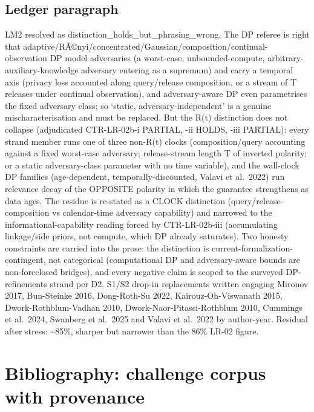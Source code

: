 \documentclass[
  11pt,
]{article}
\begin{document}
\subsection{Ledger paragraph}\label{ledger-paragraph}

LM2 resolved as distinction\_holds\_but\_phrasing\_wrong. The DP referee
is right that
adaptive/RÃ©nyi/concentrated/Gaussian/composition/continual-observation
DP model adversaries (a worst-case, unbounded-compute,
arbitrary-auxiliary-knowledge adversary entering as a supremum) and
carry a temporal axis (privacy loss accounted along query/release
composition, or a stream of T releases under continual observation), and
adversary-aware DP even parametrises the fixed adversary class; so
`static, adversary-independent' is a genuine mischaracterisation and
must be replaced. But the R(t) distinction does not collapse
(adjudicated CTR-LR-02b-i PARTIAL, -ii HOLDS, -iii PARTIAL): every
strand member runs one of three non-R(t) clocks (composition/query
accounting against a fixed worst-case adversary; release-stream length T
of inverted polarity; or a static adversary-class parameter with no time
variable), and the wall-clock DP families (age-dependent,
temporally-discounted, Valavi et al.~2022) run relevance decay of the
OPPOSITE polarity in which the guarantee strengthens as data ages. The
residue is re-stated as a CLOCK distinction (query/release-composition
vs calendar-time adversary capability) and narrowed to the
informational-capability reading forced by CTR-LR-02b-iii (accumulating
linkage/side priors, not compute, which DP already saturates). Two
honesty constraints are carried into the prose: the distinction is
current-formalization-contingent, not categorical (computational DP and
adversary-aware bounds are non-foreclosed bridges), and every negative
claim is scoped to the surveyed DP-refinements strand per D2. S1/S2
drop-in replacements written engaging Mironov 2017, Bun-Steinke 2016,
Dong-Roth-Su 2022, Kairouz-Oh-Viswanath 2015, Dwork-Rothblum-Vadhan
2010, Dwork-Naor-Pitassi-Rothblum 2010, Cummings et al.~2024, Swanberg
et al.~2025 and Valavi et al.~2022 by author-year. Residual after
stress: \textasciitilde85\%, sharper but narrower than the 86\% LR-02
figure.

\newpage

\section{Bibliography: challenge corpus with
provenance}\label{bibliography-challenge-corpus-with-provenance}
\end{document}
